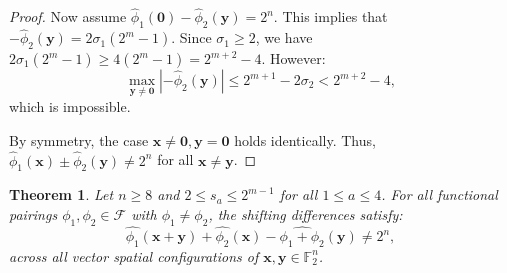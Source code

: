 \documentclass[10pt,a4paper]{amsart}
\newtheorem{theorem}{Theorem}%
\begin{document}
\begin{proof}
Now assume $\widehat{\phi}_1(\mathbf{0}) - \widehat{\phi}_2(\mathbf{y}) = 2^n$. This implies that 
$-\widehat{\phi}_2(\mathbf{y}) = 2\sigma_1(2^m - 1)$.
Since $\sigma_1 \geq 2$, we have $2\sigma_1(2^m - 1) \geq 4(2^m - 1) = 2^{m+2} - 4$. However:
\[
\max_{\mathbf{y} \neq \mathbf{0}} |-\widehat{\phi}_2(\mathbf{y})| \leq 2^{m+1} - 2\sigma_2 < 2^{m+2} - 4,
\]
which is impossible.

By symmetry, the case $\mathbf{x} \neq \mathbf{0}, \mathbf{y} = \mathbf{0}$ holds identically. Thus, $\widehat{\phi}_1(\mathbf{x}) \pm \widehat{\phi}_2(\mathbf{y}) \neq 2^n$ for all $\mathbf{x} \neq \mathbf{y}$.
\end{proof}




\begin{theorem}\label{Thm_Verify_Cond2}
Let $n \geq 8$ and $2 \leq s_a \leq 2^{m-1}$ for all $1 \leq a \leq 4$. For all functional pairings $\phi_1, \phi_2 \in \mathcal{F}$ with $\phi_1 \neq \phi_2$, the shifting differences satisfy:
\[ \widehat{\phi_1}(\mathbf{x}+\mathbf{y})+\widehat{\phi_2}(\mathbf{x})-\widehat{\phi_1+\phi_2}(\mathbf{y})\neq 2^n, \]
across all vector spatial configurations of $\mathbf{x}, \mathbf{y} \in \mathbb{F}_2^n$.
\end{theorem}
\end{document}
